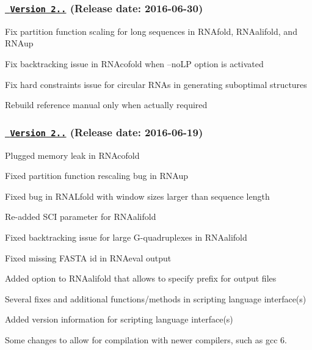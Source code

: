 \subsubsection*{\href{https://github.com/ViennaRNA/ViennaRNA/compare/v2.2.6...v2.2.7}{\texttt{ Version 2..}} (Release date\+: 2016-\/06-\/30)}


\begin{DoxyItemize}
\item Fix partition function scaling for long sequences in R\+N\+Afold, R\+N\+Aalifold, and R\+N\+Aup
\item Fix backtracking issue in R\+N\+Acofold when --no\+LP option is activated
\item Fix hard constraints issue for circular R\+N\+As in generating suboptimal structures
\item Rebuild reference manual only when actually required
\end{DoxyItemize}

\subsubsection*{\href{https://github.com/ViennaRNA/ViennaRNA/compare/v2.2.5...v2.2.6}{\texttt{ Version 2..}} (Release date\+: 2016-\/06-\/19)}


\begin{DoxyItemize}
\item Plugged memory leak in R\+N\+Acofold
\item Fixed partition function rescaling bug in R\+N\+Aup
\item Fixed bug in R\+N\+A\+Lfold with window sizes larger than sequence length
\item Re-\/added S\+CI parameter for R\+N\+Aalifold
\item Fixed backtracking issue for large G-\/quadruplexes in R\+N\+Aalifold
\item Fixed missing F\+A\+S\+TA id in R\+N\+Aeval output
\item Added option to R\+N\+Aalifold that allows to specify prefix for output files
\item Several fixes and additional functions/methods in scripting language interface(s)
\item Added version information for scripting language interface(s)
\item Some changes to allow for compilation with newer compilers, such as gcc 6.
\end{DoxyItemize}

